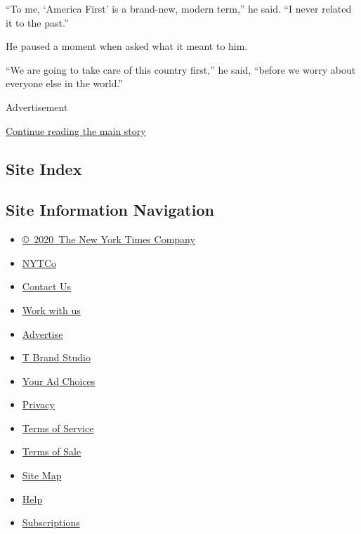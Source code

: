``To me, `America First' is a brand-new, modern term,'' he said. ``I
never related it to the past.''

He paused a moment when asked what it meant to him.

``We are going to take care of this country first,'' he said, ``before
we worry about everyone else in the world.''

Advertisement

\protect\hyperlink{after-bottom}{Continue reading the main story}

\hypertarget{site-index}{%
\subsection{Site Index}\label{site-index}}

\hypertarget{site-information-navigation}{%
\subsection{Site Information
Navigation}\label{site-information-navigation}}

\begin{itemize}
\tightlist
\item
  \href{https://help.nytimes.com/hc/en-us/articles/115014792127-Copyright-notice}{©~2020~The
  New York Times Company}
\end{itemize}

\begin{itemize}
\tightlist
\item
  \href{https://www.nytco.com/}{NYTCo}
\item
  \href{https://help.nytimes.com/hc/en-us/articles/115015385887-Contact-Us}{Contact
  Us}
\item
  \href{https://www.nytco.com/careers/}{Work with us}
\item
  \href{https://nytmediakit.com/}{Advertise}
\item
  \href{http://www.tbrandstudio.com/}{T Brand Studio}
\item
  \href{https://www.nytimes.com/privacy/cookie-policy\#how-do-i-manage-trackers}{Your
  Ad Choices}
\item
  \href{https://www.nytimes.com/privacy}{Privacy}
\item
  \href{https://help.nytimes.com/hc/en-us/articles/115014893428-Terms-of-service}{Terms
  of Service}
\item
  \href{https://help.nytimes.com/hc/en-us/articles/115014893968-Terms-of-sale}{Terms
  of Sale}
\item
  \href{https://spiderbites.nytimes.com}{Site Map}
\item
  \href{https://help.nytimes.com/hc/en-us}{Help}
\item
  \href{https://www.nytimes.com/subscription?campaignId=37WXW}{Subscriptions}
\end{itemize}
